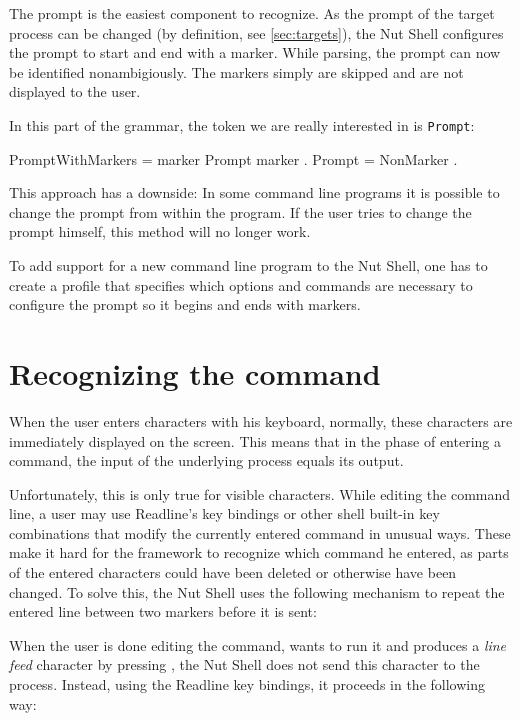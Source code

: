 \documentclass[paper=a4,twoside,abstract=on,cleardoublepage=empty,numbers=noenddot,toc=bib,12pt,appendixprefix=true]{scrreprt}
\begin{document}
The prompt is the easiest component to recognize. As the prompt of the target process can be changed (by definition, see \cref{sec:targets}), the Nut Shell configures the prompt to start and end with a marker. While parsing, the prompt can now be identified nonambigiously. The markers simply are skipped and are not displayed to the user.

In this part of the grammar, the token we are really interested in is \texttt{Prompt}:

\begin{ebnf}
PromptWithMarkers = marker Prompt marker .
Prompt = { NonMarker } .
\end{ebnf}
%
This approach has a downside: In some command line programs it is possible to change the prompt from within the program. If the user tries to change the prompt himself, this method will no longer work.

To add support for a new command line program to the Nut Shell, one has to create a profile that specifies which options and commands are necessary to configure the prompt so it begins and ends with markers.


\section{Recognizing the command}

When the user enters characters with his keyboard, normally, these characters are immediately displayed on the screen. This means that in the phase of entering a command, the input of the underlying process equals its output.

Unfortunately, this is only true for visible characters. While editing the command line, a user may use Readline's key bindings or other shell built-in key combinations that modify the currently entered command in unusual ways. These make it hard for the framework to recognize which command he entered, as parts of the entered characters could have been deleted or otherwise have been changed. To solve this, the Nut Shell uses the following mechanism to repeat the entered line between two markers before it is sent:

When the user is done editing the command, wants to run it and produces a \emph{line feed} character by pressing , the Nut Shell does not send this character to the process. Instead, using the Readline key bindings, it proceeds in the following way:
\end{document}
